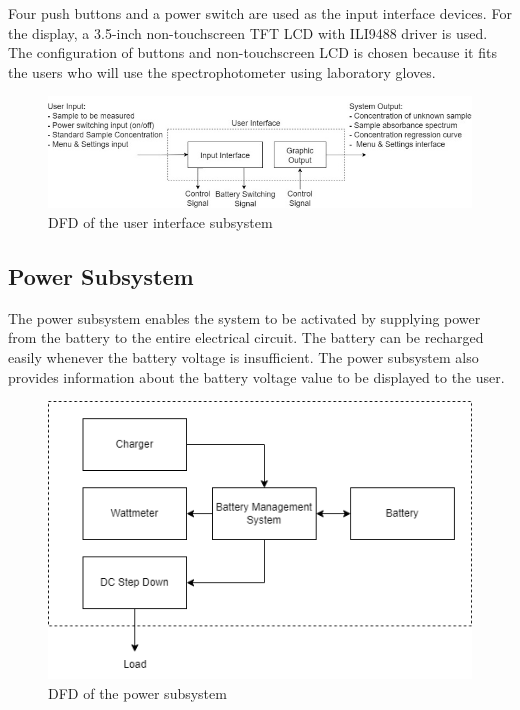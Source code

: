 \documentclass[conference]{IEEEtran}
\begin{document}
Four push buttons and a power switch are used as the input interface devices.
For the display, a 3.5-inch non-touchscreen TFT LCD with ILI9488 driver is used.
The configuration of buttons and non-touchscreen LCD is chosen because it fits the users who will use the spectrophotometer using laboratory gloves.

    \begin{figure}[htbp]
    \centerline{\includegraphics[scale=0.43]{ui-dfd.png}}
    \caption{DFD of the user interface subsystem}
    \label{ui-dfd}
    \end{figure}


\subsection{Power Subsystem}
The power subsystem enables the system to be activated by supplying power from the battery to the entire electrical circuit. The battery can be recharged easily whenever the battery voltage is insufficient. The power subsystem also provides information about the battery voltage value to be displayed to the user. 

    \begin{figure}[htbp]
    \centerline{\includegraphics[scale=0.5]{power-dfd.png}}
    \caption{DFD of the power subsystem}
    \label{power-dfd}
    \end{figure}
\end{document}
